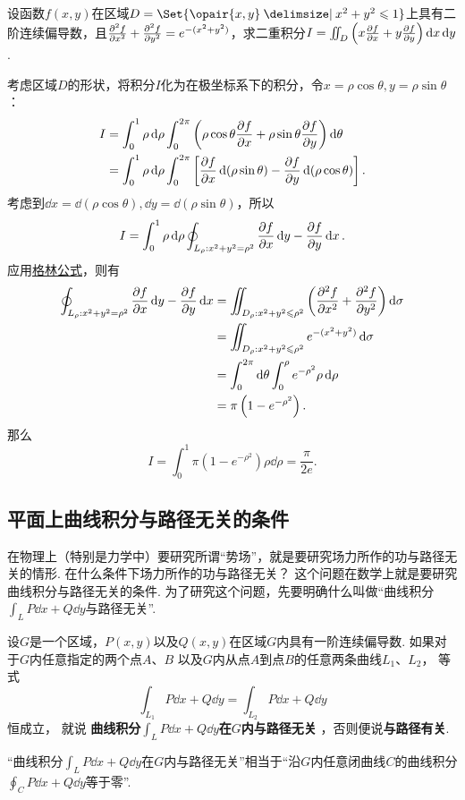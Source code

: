 \begin{example}
设函数\(f(x,y)\)在区域\(D=\Set{\opair{x,y} \given x^2+y^2\leqslant1}\)上具有二阶连续偏导数，且\(\pdv[2]{f}{x}+\pdv[2]{f}{y}=e^{-(x^2+y^2)}\)，求二重积分\(I=\iint_D\left(x\pdv{f}{x}+y\pdv{f}{y}\right)\dd{x}\dd{y}\).
\begin{solution}
考虑区域\(D\)的形状，将积分\(I\)化为在极坐标系下的积分，令\(x=\rho\cos\theta, y=\rho\sin\theta\)：\begin{align*}
I &= \int_0^1 \rho\dd{\rho} \int_0^{2\pi} \left(\rho\cos\theta\pdv{f}{x}+\rho\sin\theta\pdv{f}{y}\right) \dd{\theta} \\
&= \int_0^1 \rho\dd{\rho} \int_0^{2\pi} \left[\pdv{f}{x}\dd(\rho\sin\theta)-\pdv{f}{y}\dd(\rho\cos\theta)\right].
\end{align*}
考虑到\(\dd{x}=\dd(\rho\cos\theta), \dd{y}=\dd(\rho\sin\theta)\)，所以\[
I = \int_0^1 \rho\dd{\rho} \oint_{L_{\rho}: x^2+y^2=\rho^2} \pdv{f}{x}\dd{y}-\pdv{f}{y}\dd{x}.
\]应用\hyperref[equation:线积分与面积分.格林公式]{格林公式}，则有\begin{align*}
\oint_{L_{\rho}: x^2+y^2=\rho^2} \pdv{f}{x}\dd{y}-\pdv{f}{y}\dd{x}
&= \iint_{D_{\rho}: x^2+y^2\leqslant\rho^2} \left(\pdv[2]{f}{x}+\pdv[2]{f}{y}\right) \dd{\sigma} \\
&= \iint_{D_{\rho}: x^2+y^2\leqslant\rho^2} e^{-(x^2+y^2)} \dd{\sigma} \\
&= \int_0^{2\pi} \dd{\theta} \int_0^{\rho} e^{-\rho^2} \rho\dd{\rho} \\
&= \pi \left(1-e^{-\rho^2}\right).
\end{align*}
那么\[
I = \int_0^1 \pi \left(1-e^{-\rho^2}\right) \rho\dd{\rho}
=  \frac{\pi}{2e}.
\]
\end{solution}
\end{example}

\subsection{平面上曲线积分与路径无关的条件}
在物理上（特别是力学中）要研究所谓“势场”，就是要研究场力所作的功与路径无关的情形.
在什么条件下场力所作的功与路径无关？
这个问题在数学上就是要研究曲线积分与路径无关的条件.
为了研究这个问题，先要明确什么叫做“曲线积分\(\int_L P\dd{x}+Q\dd{y}\)与路径无关”.
\begin{definition}
设\(G\)是一个区域，\(P(x,y)\)以及\(Q(x,y)\)在区域\(G\)内具有一阶连续偏导数.
如果对于\(G\)内任意指定的两个点\(A\)、\(B\)
以及\(G\)内从点\(A\)到点\(B\)的任意两条曲线\(L_1\)、\(L_2\)，%
等式\[
\int_{L_1}{P\dd{x}+Q\dd{y}}
=\int_{L_2}{P\dd{x}+Q\dd{y}}
\]恒成立，%
就说\textbf{
曲线积分\(\int_L P\dd{x}+Q\dd{y}\)在\(G\)内与路径无关
}，否则便说\textbf{与路径有关}.
\end{definition}
“曲线积分\(\int_L P\dd{x}+Q\dd{y}\)在\(G\)内与路径无关”相当于“沿\(G\)内任意闭曲线\(C\)的曲线积分\(\oint_C P\dd{x}+Q\dd{y}\)等于零”.

